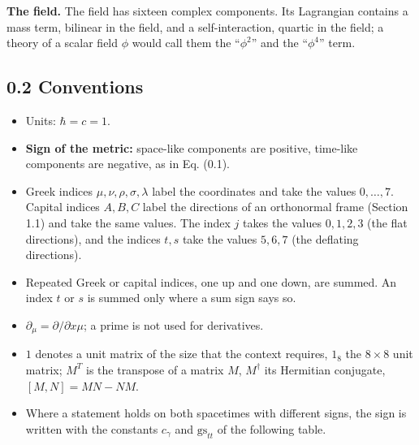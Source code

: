 \documentclass[
  10pt,
]{article}
\providecommand{\tightlist}{%
  \setlength{\itemsep}{0pt}\setlength{\parskip}{0pt}}
\begin{document}
\textbf{The field.} The field has sixteen complex components. Its
Lagrangian contains a mass term, bilinear in the field, and a
self-interaction, quartic in the field; a theory of a scalar field
\(\phi\) would call them the ``\(\phi^2\)'' and the ``\(\phi^4\)'' term.

\hypertarget{conventions}{%
\subsection{0.2 Conventions}\label{conventions}}

\begin{itemize}
\tightlist
\item
  Units: \(\hbar=c=1\).
\item
  \textbf{Sign of the metric:} space-like components are positive,
  time-like components are negative, as in Eq. (0.1).
\item
  Greek indices \(\mu,\nu,\rho,\sigma,\lambda\) label the coordinates
  and take the values \(0,\dots,7\). Capital indices \(A,B,C\) label the
  directions of an orthonormal frame (Section 1.1) and take the same
  values. The index \(j\) takes the values \(0,1,2,3\) (the flat
  directions), and the indices \(t,s\) take the values \(5,6,7\) (the
  deflating directions).
\item
  Repeated Greek or capital indices, one up and one down, are summed. An
  index \(t\) or \(s\) is summed only where a sum sign says so.
\item
  \(\partial_\mu=\partial/\partial x\mu\); a prime is not used for
  derivatives.
\item
  \(1\) denotes a unit matrix of the size that the context requires,
  \(1_8\) the \(8\times8\) unit matrix; \(M^T\) is the transpose of a
  matrix \(M\), \(M^\dagger\) its Hermitian conjugate, \([M,N]=MN-NM\).
\item
  Where a statement holds on both spacetimes with different signs, the
  sign is written with the constants \(c_\gamma\) and
  \(\mathrm{gs}_{tt}\) of the following table.
\end{itemize}
\end{document}
